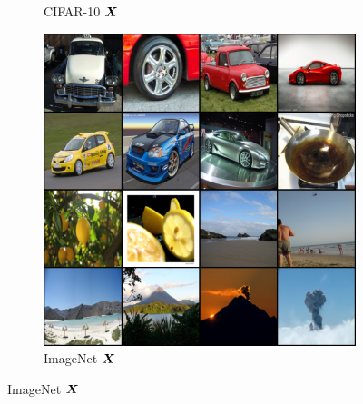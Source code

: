 \documentclass[../../book-main.tex]{subfiles}
\begin{document}
\begin{figure}[t]
\begin{subfigure}[t]{0.3\textwidth}
        \caption{{\small CIFAR-10 $\bm{X}$}}
    \end{subfigure}
    \hfill
    \begin{subfigure}[t]{0.3\textwidth}
        \centering
        \includegraphics[width=\textwidth]{chapters/chapter5/figs/Imagenet_input.png}
        \caption{{\small ImageNet $\bm{X}$}}
    \end{subfigure}


\end{figure}
\end{document}
